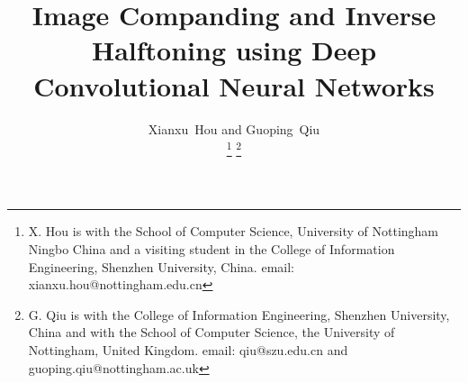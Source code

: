 \documentclass[journal]{IEEEtran}
\begin{document}
%
\title{Image Companding and Inverse Halftoning using Deep Convolutional Neural Networks}
%
%
%

%
\author{Xianxu~Hou and Guoping~Qiu

\thanks{X. Hou is with the School of Computer Science, University of Nottingham Ningbo China and a visiting student in the College of Information Engineering, Shenzhen University, China. email: xianxu.hou@nottingham.edu.cn}
\thanks{G. Qiu is with the College of Information Engineering, Shenzhen University, China and with the School of Computer Science, the University of Nottingham, United Kingdom. email: qiu@szu.edu.cn and guoping.qiu@nottingham.ac.uk}}%

%
%
\end{document}
